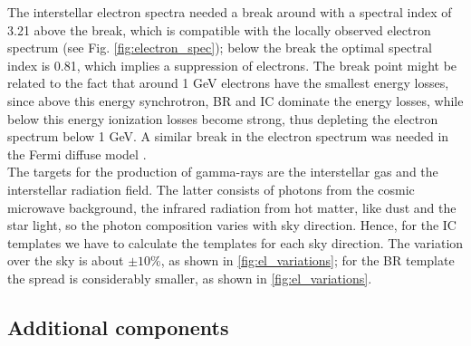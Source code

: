 The interstellar electron spectra needed a break around  with a spectral index of 3.21 above the break, which is compatible with the locally observed electron spectrum (see Fig. \ref{fig:electron_spec}); below the break the optimal spectral index is 0.81, which implies a suppression of electrons. The break point might be related to the fact that around 1 GeV electrons have the smallest energy losses, since above this energy synchrotron, BR and IC dominate the energy losses, while below this energy ionization losses become strong, thus depleting the electron spectrum below 1 GeV. A similar break in the electron spectrum was needed in the Fermi diffuse model .\\
The targets for the production of gamma-rays are the interstellar gas and the interstellar radiation field. The latter consists of photons from the cosmic microwave background, the infrared radiation from hot matter, like dust and the star light, so the photon composition varies with sky direction. Hence, for the IC templates we have to calculate the templates for each sky direction. The variation over the sky is about $\pm 10\%$, as shown in \ref{fig:el_variations}; for the BR template the spread is considerably smaller, as shown in \ref{fig:el_variations}. %






\subsection{Additional components}

